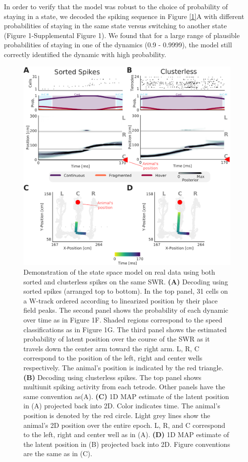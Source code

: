 \documentclass[times, twoside]{zHenriquesLab-StyleBioRxiv}
\begin{document}
In order to verify that the model was robust to the choice of probability of staying in a state, we decoded the spiking sequence in Figure \ref{1}A with different probabilities of staying in the same state versus switching to another state (Figure 1-Supplemental Figure 1). We found that for a large range of plausible probabilities of staying in one of the dynamics (0.9 - 0.9999), the model still correctly identified the dynamic with high probability.

\begin{figure}%
\centering
\includegraphics[width=0.80\linewidth]{figures/Figure2/Figure2_v3}
\caption{Demonstration of the state space model on real data using both sorted and clusterless spikes on the same SWR. \textbf{(A)} Decoding using sorted spikes (arranged top to bottom). In the top panel, 31 cells on a W-track ordered according to linearized position by their place field peaks. The second panel shows the probability of each dynamic over time as in Figure 1F. Shaded regions correspond to the speed classifications as in Figure 1G. The third panel shows the estimated probability of latent position over the course of the SWR as it travels down the center arm toward the right arm. L, R, C correspond to the position of the left, right and center wells respectively. The animal's position is indicated by the red triangle. \textbf{(B)} Decoding using clusterless spikes. The top panel shows multiunit spiking activity from each tetrode. Other panels have the same convention as(A).  \textbf{(C)} 1D MAP estimate of the latent position in (A) projected back into 2D. Color indicates time. The animal's position is denoted by the red circle. Light grey lines show the animal's 2D position over the entire epoch. L, R, and C correspond to the left, right and center well as in (A). \textbf{(D)} 1D MAP estimate of the latent position in (B) projected back into 2D. Figure conventions are the same as in (C).
}
\label{2}
\end{figure}
\end{document}
